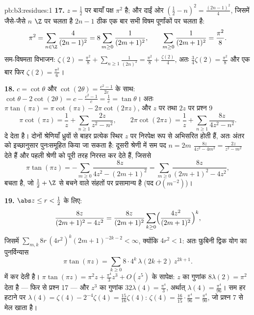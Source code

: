 \begin{solution}{pb:b3:residues:1}
\textbf{17.} $z = \frac12$ पर बायाँ पक्ष $\pi^2$ है; और दाईं ओर $(\frac12 - n)^2 = \frac{(2n-1)^2}4$, जिसमें
जैसे-जैसे $n$ $\Z$ पर चलता है $2n -
1$ ठीक एक बार सभी विषम पूर्णांकों
पर चलता है:
\[
\pi^2 = \sum_{n\in\Z}\frac{4}{(2n-1)^2}
= 8\sum_{m\geq0}\frac1{(2m+1)^2},
\qquad
\sum_{m\geq0}\frac1{(2m+1)^2} = \frac{\pi^2}8 .
\]
सम-विषमता विभाजन: $\zeta(2) = \frac{\pi^2}8 +
\sum_{n\geq1}\frac1{(2n)^2} = \frac{\pi^2}8 +
\frac{\zeta(2)}4$, अतः $\frac34\zeta(2) = \frac{\pi^2}8$ और एक बार फिर $\zeta(2) = \frac{\pi^2}6$।

\textbf{18.} $c = \cot\theta$ और $\cot(2\theta) =
\frac{c^2-1}{2c}$ के साथ: $\cot\theta - 2\cot(2\theta) = c -
\frac{c^2-1}c = \frac1c = \tan\theta$। अतः $\pi\tan(\pi z)
= \pi\cot(\pi z) - 2\pi\cot(2\pi z)$, और $z$ पर
तथा $2z$ पर प्रश्न 9
\[
\pi\cot(\pi z) = \frac1z +
\sum_{n\geq1}\frac{2z}{z^2 - n^2},
\qquad
2\pi\cot(2\pi z) = \frac1z +
\sum_{n\geq1}\frac{8z}{4z^2 - n^2} .
\]
दे देता है। दोनों श्रेणियाँ ध्रुवों से बाहर प्रत्येक स्थिर $z$ पर
निरपेक्ष रूप से अभिसरित होती हैं, अतः अंतर को इच्छानुसार पुनःसमूहित
किया जा सकता है: दूसरी श्रेणी में सम पद $n = 2m$ $\frac{8z}{4z^2 -
4m^2} = \frac{2z}{z^2 - m^2}$ देते हैं और पहली
श्रेणी को पूरी तरह निरस्त कर देते हैं, जिससे
\[
\pi\tan(\pi z) = -\sum_{m\geq0}\frac{8z}{4z^2 - (2m+1)^2}
= \sum_{m\geq0}\frac{8z}{(2m+1)^2 - 4z^2} ,
\]
बचता है, जो $\frac12 + \Z$ से बचने वाले संहतों पर प्रसामान्य है (पद $O(m^{-2})$)।

\textbf{19.} $\abs z \leq r < \frac12$ के लिए:
\[
\frac{8z}{(2m+1)^2 - 4z^2} = \frac{8z}{(2m+1)^2}
\sum_{k\geq0}\Bigl(\frac{4z^2}{(2m+1)^2}\Bigr)^{k},
\]
जिसमें $\sum_{m,k}8r\,(4r^2)^k(2m+1)^{-2k-2} < \infty$, क्योंकि $4r^2 < 1$: अतः फुबिनी द्विक योग का पुनर्विन्यास
\[
\pi\tan(\pi z) =
\sum_{k\geq0}8\cdot4^k\,\lambda(2k+2)\,z^{2k+1} .
\]
में कर देती है। $\pi\tan(\pi z) = \pi^2z + \frac{\pi^4}3z^3 +
O(z^5)$ के सापेक्ष: $z$ का गुणांक $8\lambda(2) = \pi^2$ देता है ---
फिर से प्रश्न 17 --- और $z^3$ का गुणांक $32\lambda(4) = \frac{\pi^4}3$, अर्थात् $\lambda(4) =
\frac{\pi^4}{96}$। सम हर
हटाने पर $\lambda(4) = \zeta(4) - 2^{-4}\zeta(4) =
\frac{15}{16}\zeta(4)$: $\zeta(4) = \frac{16}{15}\cdot
\frac{\pi^4}{96} = \frac{\pi^4}{90}$, जो प्रश्न 7 से मेल खाता है।


\end{solution}
